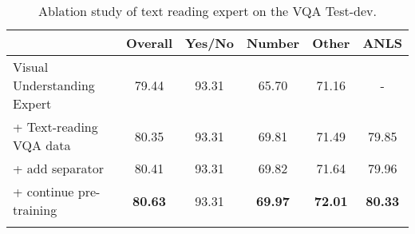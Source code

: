 \begin{comment}
\begin{table}[!h]
\centering
\caption{Ablation study of text reading expert on the VQA Test-dev.}
\begin{tabular}{lcccc}
\toprule
           & Overall & Yes/No & Number & Other \\
MoE (Text Reading \& Visual Understanding) & 80.63 & 93.31 & 69.97 & 72.01 \\
w/o Text Reading Expert &  79.44  & 93.31 &  65.70 & 71.16   \\

w/o TextVQA \& ST-VQA   &  80.28   &  93.31  & 69.43   & 71.47 \\
w/o add separator &   80.57 & 93.31 & 69.95 & 71.86 \\
w/o continue pre-training  &  80.41 &   93.31  &    69.82   &   71.64    \\
\bottomrule
\label{tab:structlm}
\end{tabular}
\end{table}
\end{comment}


\begin{table}[!h]
\centering
\caption{Ablation study of text reading expert on the VQA Test-dev.}
\begin{tabular}{lcccc|c}
\toprule
           & Overall & Yes/No & Number & Other & ANLS \\
\midrule
Visual Understanding Expert & 79.44  & 93.31 &  65.70 & 71.16 & - \\
\: + Text-reading VQA data & 80.35 & 93.31 & 69.81 & 71.49 & 79.85 \\
 \: \: + add separator &  80.41 &   93.31  & 69.82   &   71.64 & 79.96 \\
 \: \: \: + continue pre-training  & \textbf{80.63} & 93.31 & \textbf{69.97} & \textbf{72.01} & \textbf{80.33} \\
\bottomrule
\label{tab:structlm}
\end{tabular}
\end{table}

